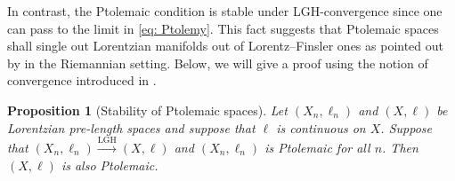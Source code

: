 \documentclass[hidelinks,12pt,a4paper]{article}
\numberwithin{equation}{section}
\theoremstyle{plain}
\newtheorem{definition}{Definition}[section]
\newtheorem{proposition}[definition]{Proposition}
\theoremstyle{definition}
\newcommand{\LpLS}{Lo\-rentz\-ian pre-length space }
\newcommand{\LpLSn}{Lo\-rentz\-ian pre-length space}
\begin{document}
 
In contrast, the Ptolemaic condition is stable under LGH-convergence since one can pass to the limit in \eqref{eq: Ptolemy}. 
This fact suggests that Ptolemaic spaces shall single out Lorentzian manifolds out of Lorentz--Finsler ones as pointed out by \cite[Theorem 1.2]{BuFaWra} in the Riemannian setting.
Below, we will give a proof using the notion of convergence introduced in \cite{MS}. 



\begin{proposition}[Stability of Ptolemaic spaces]
\label{lem: ptolemy stability}
Let \((X_n, \ell_n)\) and \((X, \ell)\) be Lorentzian pre-length spaces and suppose that $\ell$ is continuous on $X$.
Suppose that \((X_n, \ell_n)\xrightarrow{\mathrm{LGH}} (X, \ell)\) and \((X_n,\ell_n)\) is Ptolemaic for all \(n\). 
Then \((X, \ell)\) is also Ptolemaic.
\end{proposition}
\end{document}
